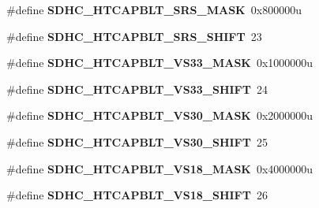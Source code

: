 \begin{DoxyCompactItemize}
\item 
\hypertarget{group___s_d_h_c___register___masks_ga62e346d8925d26124eb284b4ebf984d3}{}\#define {\bfseries S\+D\+H\+C\+\_\+\+H\+T\+C\+A\+P\+B\+L\+T\+\_\+\+S\+R\+S\+\_\+\+M\+A\+S\+K}~0x800000u\label{group___s_d_h_c___register___masks_ga62e346d8925d26124eb284b4ebf984d3}

\item 
\hypertarget{group___s_d_h_c___register___masks_ga47c009f4b74a67296231bb73fa1c74f8}{}\#define {\bfseries S\+D\+H\+C\+\_\+\+H\+T\+C\+A\+P\+B\+L\+T\+\_\+\+S\+R\+S\+\_\+\+S\+H\+I\+F\+T}~23\label{group___s_d_h_c___register___masks_ga47c009f4b74a67296231bb73fa1c74f8}

\item 
\hypertarget{group___s_d_h_c___register___masks_gaefb26b10e16d07a763c3a6aa87d64c77}{}\#define {\bfseries S\+D\+H\+C\+\_\+\+H\+T\+C\+A\+P\+B\+L\+T\+\_\+\+V\+S33\+\_\+\+M\+A\+S\+K}~0x1000000u\label{group___s_d_h_c___register___masks_gaefb26b10e16d07a763c3a6aa87d64c77}

\item 
\hypertarget{group___s_d_h_c___register___masks_ga134420d6cffd9c730caecd7cc64f1d41}{}\#define {\bfseries S\+D\+H\+C\+\_\+\+H\+T\+C\+A\+P\+B\+L\+T\+\_\+\+V\+S33\+\_\+\+S\+H\+I\+F\+T}~24\label{group___s_d_h_c___register___masks_ga134420d6cffd9c730caecd7cc64f1d41}

\item 
\hypertarget{group___s_d_h_c___register___masks_ga0ca13e82557e6d15a923fe3a389d36fb}{}\#define {\bfseries S\+D\+H\+C\+\_\+\+H\+T\+C\+A\+P\+B\+L\+T\+\_\+\+V\+S30\+\_\+\+M\+A\+S\+K}~0x2000000u\label{group___s_d_h_c___register___masks_ga0ca13e82557e6d15a923fe3a389d36fb}

\item 
\hypertarget{group___s_d_h_c___register___masks_ga519f2554cbaafb3391d0d123f2536f80}{}\#define {\bfseries S\+D\+H\+C\+\_\+\+H\+T\+C\+A\+P\+B\+L\+T\+\_\+\+V\+S30\+\_\+\+S\+H\+I\+F\+T}~25\label{group___s_d_h_c___register___masks_ga519f2554cbaafb3391d0d123f2536f80}

\item 
\hypertarget{group___s_d_h_c___register___masks_ga5677e346e2d7f65fbaf2615a331f3438}{}\#define {\bfseries S\+D\+H\+C\+\_\+\+H\+T\+C\+A\+P\+B\+L\+T\+\_\+\+V\+S18\+\_\+\+M\+A\+S\+K}~0x4000000u\label{group___s_d_h_c___register___masks_ga5677e346e2d7f65fbaf2615a331f3438}

\item 
\hypertarget{group___s_d_h_c___register___masks_gaa162e0efb46d0271d898b43e7707e8e0}{}\#define {\bfseries S\+D\+H\+C\+\_\+\+H\+T\+C\+A\+P\+B\+L\+T\+\_\+\+V\+S18\+\_\+\+S\+H\+I\+F\+T}~26\label{group___s_d_h_c___register___masks_gaa162e0efb46d0271d898b43e7707e8e0}


\end{DoxyCompactItemize}

